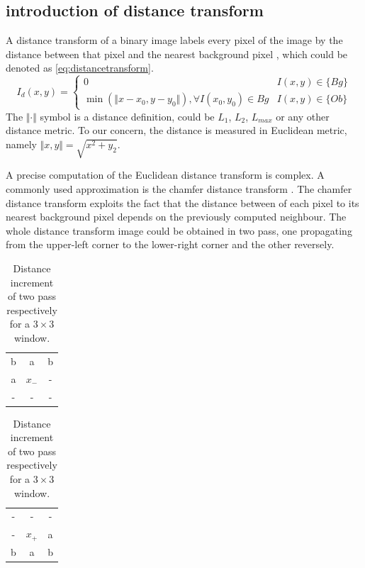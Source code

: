 \subsection{introduction of distance transform}
A distance transform of a binary image labels every pixel of the image by the distance between that pixel and the nearest background pixel \cite{bailey2004efficient}, which could be denoted as \autoref{eq:distancetransform}.
\begin{equation}\label{eq:distancetransform}
  I_d(x,y) = \left\{\begin{array}{cc}
               0 & I(x,y)\in\{Bg\} \\
               \min\left(\Vert x-x_0,y-y_0\Vert\right),\forall I(x_0,y_0)\in Bg & I(x,y)\in\{Ob\}
             \end{array}\right.
\end{equation}
The $\Vert\cdot\Vert$ symbol is a distance definition, could be $L_1$, $L_2$, $L_{max}$ or any other distance metric. To our concern, the distance is measured in Euclidean metric, namely $\Vert x,y\Vert=\sqrt{x^2+y_2}$.

A precise computation of the Euclidean distance transform is complex. A commonly used approximation is the chamfer distance transform \cite{butt1998optimum}. The chamfer distance transform exploits the fact that the distance between of each pixel to its nearest background pixel depends on the previously computed neighbour. The whole distance transform image could be obtained in two pass, one propagating from the upper-left corner to the lower-right corner and the other reversely.

\begin{table}
  \centering
  \begin{tabular}{|c|c|c|}
    \hline
    b & a & b \\
    a & $x_-$ & - \\
    - & - & - \\
    \hline
  \end{tabular}
  \begin{tabular}{|c|c|c|}
  \hline
    - & - & - \\
    - & $x_+$ & a \\
    b & a & b \\
    \hline
  \end{tabular}
  \caption{Distance increment of two pass respectively for a $3\times3$ window.}\label{tab:chamfertable}
\end{table}


